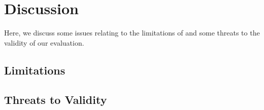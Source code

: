 \section{Discussion}
\label{Sec:Discussion}
Here, we discuss some issues relating to the limitations of \dompletion and some threats to the validity of our evaluation.

	\subsection{Limitations}
	\label{Sec:Limitations}
	
	
	
	
	
	
	
	
	
	\subsection{Threats to Validity}
	\label{Sec:Threats}